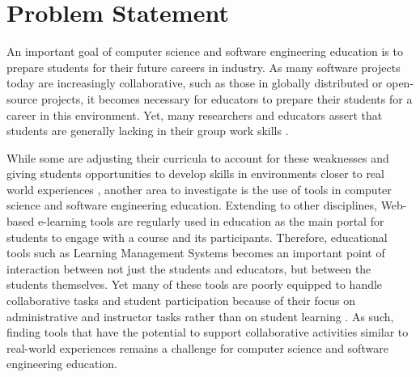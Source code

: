 \section{Problem Statement}
An important goal of computer science and software engineering education is to prepare students for their future careers in industry. As many software projects today are increasingly collaborative, such as those in globally distributed or open-source projects, it becomes necessary for educators to prepare their students for a career in this environment. Yet, many researchers and educators assert that students are generally lacking in their group work skills \cite{waite2004student}.

While some are adjusting their curricula to account for these weaknesses \cite{jazayeri2004education} and giving students opportunities to develop skills in environments closer to real world experiences \cite{coleman2012collaboration}, another area to investigate is the use of tools in computer science and software engineering education. Extending to other disciplines, Web-based e-learning tools are regularly used in education as the main portal for students to engage with a course and its participants. Therefore, educational tools such as Learning Management Systems becomes an important point of interaction between not just the students and educators, but between the students themselves. Yet many of these tools are poorly equipped to handle collaborative tasks and student participation because of their focus on administrative and instructor tasks rather than on student learning \cite{mcloughlin2007social}. As such, finding tools that have the potential to support collaborative activities similar to real-world experiences remains a challenge for computer science and software engineering education.



